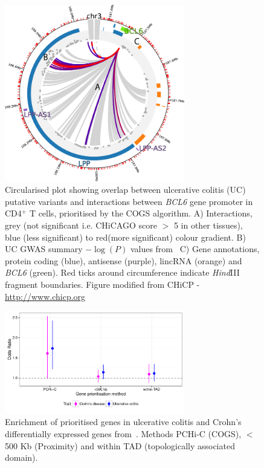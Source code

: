 \documentclass[a4paper,11pt]{report}
\begin{document}
\begin{figure}[ht]
\centering
\includegraphics[width=0.7\textwidth]{CHiCP-BCL6-Naive_CD4.pdf}
\caption{Circularised plot showing overlap between ulcerative colitis (UC) putative variants and  interactions between \textit{BCL6} gene promoter in CD4$^+$ T cells, prioritised by the COGS algorithm. A) Interactions, grey (not significant i.e. CHiCAGO score $>$ 5 in other tissues), blue (less significant) to red(more significant) colour gradient. B) UC GWAS summary $-\log(P)$ values from~\citet{Anderson2011-ch} C)  Gene annotations, protein coding (blue), antisense (purple), lincRNA (orange) and \textit{BCL6} (green). Red ticks around circumference indicate \textit{Hind}III fragment boundaries. Figure modified from CHiCP - \url{http://www.chicp.org}~\citep{SchofieldCarverAchuthanEtAl2016} }
\label{fig:bcl6}
\end{figure}

\begin{figure}[ht]
\centering
\includegraphics[width=0.7\textwidth]{ibd-tadprox.pdf}
\caption{Enrichment of prioritised genes in ulcerative colitis and Crohn's differentially expressed genes from~\citet{PetersLyonsLeeEtAl2016}. Methods PCHi-C (COGS), $<$ 500 Kb (Proximity) and within TAD (topologically associated domain).}
\label{fig:peters_odds_ratio}
\end{figure}
\end{document}
